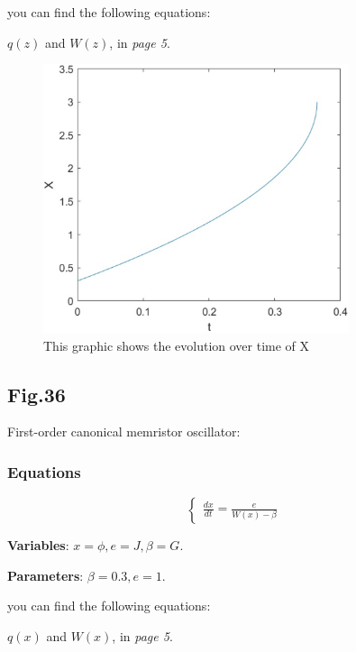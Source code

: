 \documentclass[12pt, a4paper]{paper}
\begin{document}
you can find the following equations:

$q(z)$ and $W(z)$, in \textit{page 5}.

\begin{figure}[h]
\centering
\includegraphics[width=0.8\textwidth]{Fig_32.eps}
\caption{This graphic shows the evolution over time of X}
\end{figure}

\newpage
\subsection{Fig.36}
First-order canonical memristor oscillator:
\subsubsection{Equations}
\begin{equation}
\begin{cases}
\frac{dx}{dt}=\frac{e}{W(x)-\beta}
\end{cases}
\end{equation}

\textbf{Variables}: $x=\phi, e=J, \beta=G$.

\textbf{Parameters}: $\beta =0.3, e=1$.

you can find the following equations:

$q(x)$ and $W(x)$, in \textit{page 5}.
\end{document}
